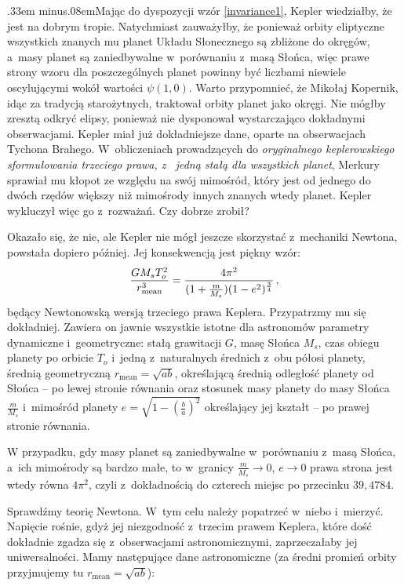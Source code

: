 \begin{dwieszpalty} {\spaceskip.33em minus.08emMając do dyspozycji  wzór \eqref{invariance1}, Kepler wiedziałby, że jest na dobrym tropie. Natychmiast zauważyłby, że ponieważ orbity eliptyczne wszystkich znanych mu planet Układu Słonecznego są zbliżone do okręgów, a~masy planet są zaniedbywalne w~porównaniu z~masą Słońca, więc prawe strony wzoru dla poszczególnych planet powinny być liczbami niewiele oscylującymi wokół wartości $\psi(1,0)$. Warto przypomnieć, że Mikołaj Kopernik, idąc za tradycją starożytnych, traktował orbity planet jako okręgi. Nie mógłby zresztą odkryć elipsy, ponieważ nie dysponował wystarczająco dokładnymi obserwacjami. Kepler miał już dokładniejsze dane, oparte na obserwacjach Tychona Brahego. W~obliczeniach prowadzących do {\it oryginalnego keplerowskiego sformułowania trzeciego prawa, z~%
jedną stałą dla wszystkich planet}, Merkury sprawiał mu kłopot ze względu na swój mimośród, który jest od jednego do dwóch rzędów większy niż mimośrody innych znanych wtedy planet. Kepler wykluczył więc go z~rozważań. Czy dobrze zrobił?}


Okazało się, że nie, ale Kepler nie mógł jeszcze skorzystać z~mechaniki Newtona,  powstała dopiero później. Jej konsekwencją jest piękny wzór:\vspace*{2pt}
\begin{equation}\label{piękny}
   \frac{GM_sT_o^2}{r_{\mathrm{mean}}^3} =
  \frac{4\pi^2}
  {(1+\frac{m}{M_s})(1-e^2)^{\frac{3}{4}}}\,,\vspace*{2pt}
\end{equation}
będący Newtonowską wersją trzeciego prawa Keplera.
 Przypatrzmy mu się dokładniej. Zawiera on jawnie wszystkie istotne dla astronomów parametry dynamiczne i~geometryczne: stałą grawitacji $G$, masę Słońca $M_s$, czas obiegu planety po orbicie $T_o$ i~jedną z~naturalnych średnich z~obu półosi planety, średnią geometryczną $r_{\mathrm{mean}}=\sqrt{ab}$, określającą średnią odległość planety od Słońca -- po lewej stronie równania oraz
stosunek masy planety do masy Słońca $\frac{m}{M_s}$ i~mimośród planety $e=\sqrt{1-(\frac{b}{a})^2}$ określający jej kształt -- po prawej stronie równania.

W przypadku, gdy masy planet są zaniedbywalne w~porównaniu z~masą Słońca, a~ich mimośrody są bardzo małe, to w~granicy 
$\frac{m}{M_s}\to 0$, $e\to 0$ prawa strona jest wtedy równa $4\pi^2$, czyli z~dokładnością do czterech miejsc po przecinku $39{,}4784$.  

Sprawdźmy teorię Newtona. W~tym celu należy popatrzeć w~niebo i~mierzyć. Napięcie rośnie, gdyż jej niezgodność z~trzecim prawem Keplera, które dość dokładnie zgadza się z~obserwacjami astronomicznymi,  
zaprzeczałaby jej uniwersalności.
Mamy następujące dane astronomiczne
(za średni promień orbity przyjmujemy tu $r_{\mathrm{mean}} = \sqrt{ab}$):


\end{dwieszpalty}
